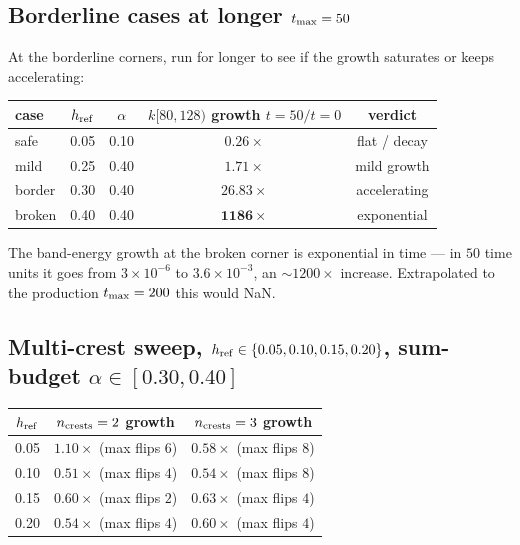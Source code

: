 \documentclass[11pt]{article}
\begin{document}
\subsection{Borderline cases at longer $t_{\rm max} = 50$}

At the borderline corners, run for longer to see if the growth saturates or
keeps accelerating:

\begin{center}
\begin{tabular}{l c c c c}
\toprule
case & $h_{\rm ref}$ & $\alpha$ & $k[80,128)$ growth $t=50/t=0$ & verdict \\
\midrule
safe   & 0.05 & 0.10 & $0.26\times$         & flat / decay \\
mild   & 0.25 & 0.40 & $1.71\times$         & mild growth \\
border & 0.30 & 0.40 & $\mathbf{26.83\times}$ & accelerating \\
broken & 0.40 & 0.40 & $\mathbf{1186\times}$  & exponential \\
\bottomrule
\end{tabular}
\end{center}

The band-energy growth at the broken corner is exponential in time --- in
$50$ time units it goes from $3 \times 10^{-6}$ to $3.6 \times 10^{-3}$, an
$\sim 1200\times$ increase. Extrapolated to the production $t_{\rm max} = 200$
this would NaN.

\subsection{Multi-crest sweep, $h_{\rm ref} \in \{0.05, 0.10, 0.15, 0.20\}$, sum-budget $\alpha \in [0.30, 0.40]$}

\begin{center}
\begin{tabular}{c|cc}
\toprule
$h_{\rm ref}$ & $n_{\rm crests}=2$ growth & $n_{\rm crests}=3$ growth \\
\midrule
0.05 & $1.10\times$ (max flips $6$) & $0.58\times$ (max flips $8$) \\
0.10 & $0.51\times$ (max flips $4$) & $0.54\times$ (max flips $8$) \\
0.15 & $0.60\times$ (max flips $2$) & $0.63\times$ (max flips $4$) \\
0.20 & $0.54\times$ (max flips $4$) & $0.60\times$ (max flips $4$) \\
\bottomrule
\end{tabular}
\end{center}
\end{document}
